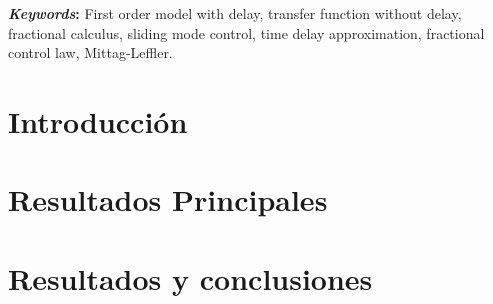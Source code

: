\documentclass[a4paper, 12pt]{report}
\begin{document}
\textbf{\textit{Keywords}:} First order model with delay, transfer function without delay, fractional calculus, sliding mode control, time delay approximation, fractional control law, Mittag-Leffler.

\tableofcontents %

\clearpage
\listoffigures %

\chapter{Introducción}\label{cap.introduccion}
\chapter{Resultados Principales}
\chapter*{Resultados y conclusiones}





\end{document}
